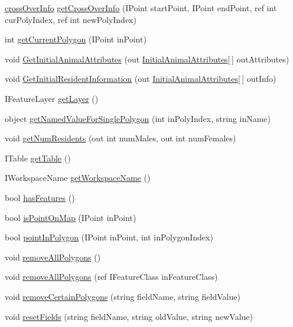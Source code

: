 \begin{DoxyCompactItemize}
\item 
\hyperlink{class_s_e_a_r_c_h_1_1cross_over_info}{cross\-Over\-Info} \hyperlink{class_s_e_a_r_c_h_1_1_map_a8e085c0c103c7bba868cd5ec6dc58576}{get\-Cross\-Over\-Info} (I\-Point start\-Point, I\-Point end\-Point, ref int cur\-Poly\-Index, ref int new\-Poly\-Index)
\item 
int \hyperlink{class_s_e_a_r_c_h_1_1_map_afaf6c24ab8c14ff1c899a331b0af263d}{get\-Current\-Polygon} (I\-Point in\-Point)
\item 
void \hyperlink{class_s_e_a_r_c_h_1_1_map_a1fc41928b46c1c153da6cd9c413a0e0b}{Get\-Initial\-Animal\-Attributes} (out \hyperlink{class_s_e_a_r_c_h_1_1_initial_animal_attributes}{Initial\-Animal\-Attributes}\mbox{[}$\,$\mbox{]} out\-Attributes)
\item 
void \hyperlink{class_s_e_a_r_c_h_1_1_map_a8d92602d25d37e55689650b6729b4404}{Get\-Initial\-Resident\-Information} (out \hyperlink{class_s_e_a_r_c_h_1_1_initial_animal_attributes}{Initial\-Animal\-Attributes}\mbox{[}$\,$\mbox{]} out\-Info)
\item 
I\-Feature\-Layer \hyperlink{class_s_e_a_r_c_h_1_1_map_a98660ce67b8d9d9a47315817e7d09ff6}{get\-Layer} ()
\item 
object \hyperlink{class_s_e_a_r_c_h_1_1_map_a81a287684ca0d411786b71be886fa738}{get\-Named\-Value\-For\-Single\-Polygon} (int in\-Poly\-Index, string in\-Name)
\item 
void \hyperlink{class_s_e_a_r_c_h_1_1_map_aede5d9970e67130ec00d6e39e083caf6}{get\-Num\-Residents} (out int num\-Males, out int num\-Females)
\item 
I\-Table \hyperlink{class_s_e_a_r_c_h_1_1_map_a3ab1be09a8e0f4162c9ca7cd41a38d70}{get\-Table} ()
\item 
I\-Workspace\-Name \hyperlink{class_s_e_a_r_c_h_1_1_map_a78a2dab5002abc586117ea0c578bb9fc}{get\-Workspace\-Name} ()
\item 
bool \hyperlink{class_s_e_a_r_c_h_1_1_map_a728c467f17a14b09253045c0ced6fa79}{has\-Features} ()
\item 
bool \hyperlink{class_s_e_a_r_c_h_1_1_map_a7505c8517f1473cc8fdb67c308a005c6}{is\-Point\-On\-Map} (I\-Point in\-Point)
\item 
bool \hyperlink{class_s_e_a_r_c_h_1_1_map_a0fccbfbd63531ec7bcf6827211f215d3}{point\-In\-Polygon} (I\-Point in\-Point, int in\-Polygon\-Index)
\item 
void \hyperlink{class_s_e_a_r_c_h_1_1_map_a0417e4240959d334d20e22acacb12577}{remove\-All\-Polygons} ()
\item 
void \hyperlink{class_s_e_a_r_c_h_1_1_map_a1897b0a81b39a56adbd3bcd467ba30c4}{remove\-All\-Polygons} (ref I\-Feature\-Class in\-Feature\-Class)
\item 
void \hyperlink{class_s_e_a_r_c_h_1_1_map_a12b9f060fa1a70b29c9856f71559f383}{remove\-Certain\-Polygons} (string field\-Name, string field\-Value)
\item 
void \hyperlink{class_s_e_a_r_c_h_1_1_map_aedc41065fe67279790a7a98ca250d5fd}{reset\-Fields} (string field\-Name, string old\-Value, string new\-Value)
\end{DoxyCompactItemize}
